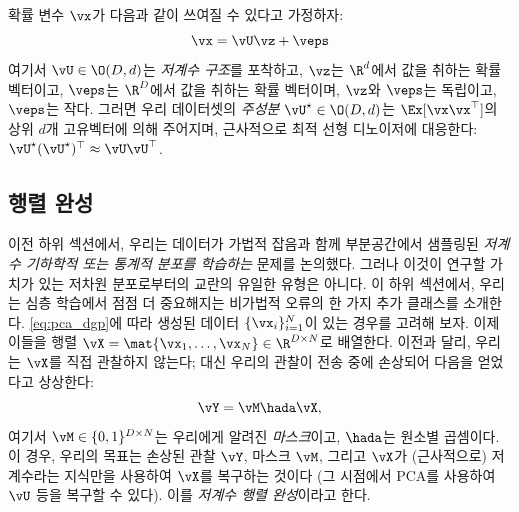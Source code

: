 \documentclass[../../book-main_ko.tex]{subfiles}
\begin{document}
\begin{theorem}\label{thm:ppca}
    확률 변수 \(\vx\)가 다음과 같이 쓰여질 수 있다고 가정하자:
    \begin{equation}
        \vx = \vU\vz + \veps
    \end{equation}
    여기서 \(\vU \in \O(D, d)\)는 \textit{저계수 구조}를 포착하고, \(\vz\)는 \(\R^{d}\)에서 값을 취하는 확률 벡터이고, \(\veps\)는 \(\R^{D}\)에서 값을 취하는 확률 벡터이며, \(\vz\)와 \(\veps\)는 독립이고, \(\veps\)는 작다. 그러면 우리 데이터셋의 \textit{주성분} \(\vU^{\star} \in \O(D, d)\)는 \(\Ex[\vx\vx^{\top}]\)의 상위 \(d\)개 고유벡터에 의해 주어지며, 근사적으로 최적 선형 디노이저에 대응한다: \(\vU^{\star}(\vU^{\star})^{\top} \approx \vU\vU^{\top}\).
\end{theorem}



\subsection{행렬 완성}

이전 하위 섹션에서, 우리는 데이터가 가법적 잡음과 함께 부분공간에서 샘플링된 \textit{저계수 기하학적 또는 통계적 분포를 학습하는} 문제를 논의했다. 그러나 이것이 연구할 가치가 있는 저차원 분포로부터의 교란의 유일한 유형은 아니다. 이 하위 섹션에서, 우리는 심층 학습에서 점점 더 중요해지는 비가법적 오류의 한 가지 추가 클래스를 소개한다. \eqref{eq:pca_dgp}에 따라 생성된 데이터 \(\{\vx_{i}\}_{i = 1}^{N}\)이 있는 경우를 고려해 보자. 이제 이들을 행렬 \(\vX = \mat{\vx_{1}, \dots, \vx_{N}} \in \R^{D \times N}\)로 배열한다. 이전과 달리, 우리는 \(\vX\)를 직접 관찰하지 않는다; 대신 우리의 관찰이 전송 중에 손상되어 다음을 얻었다고 상상한다:
\begin{equation}
    \vY = \vM \hada \vX,
\end{equation}
여기서 \(\vM \in \{0, 1\}^{D \times N}\)는 우리에게 알려진 \textit{마스크}이고, \(\hada\)는 원소별 곱셈이다. 이 경우, 우리의 목표는 손상된 관찰 \(\vY\), 마스크 \(\vM\), 그리고 \(\vX\)가 (근사적으로) 저계수라는 지식만을 사용하여 \(\vX\)를 복구하는 것이다 (그 시점에서 PCA를 사용하여 \(\vU\) 등을 복구할 수 있다). 이를 \textit{저계수 행렬 완성}이라고 한다.
\end{document}

